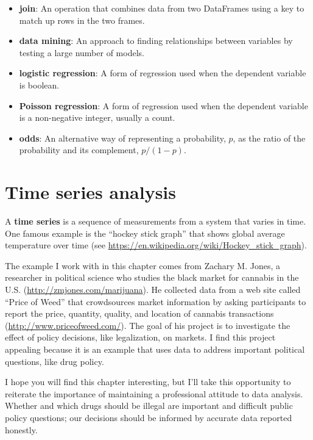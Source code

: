 \documentclass[12pt]{book}
\begin{document}
\begin{itemize}
\item {\bf join}: An operation that combines data from two DataFrames
using a key to match up rows in the two frames.

\item {\bf data mining}: An approach to finding relationships between
variables by testing a large number of models.

\item {\bf logistic regression}: A form of regression used when the
dependent variable is boolean.

\item {\bf Poisson regression}: A form of regression used when the
dependent variable is a non-negative integer, usually a count.

\item {\bf odds}: An alternative way of representing a probability, $p$, as
  the ratio of the probability and its complement, $p / (1-p)$.

\end{itemize}



\chapter{Time series analysis}

A {\bf time series} is a sequence of measurements from a system that
varies in time.  One famous example is the ``hockey stick graph'' that
shows global average temperature over time (see
\url{https://en.wikipedia.org/wiki/Hockey_stick_graph}).

The example I work with in this chapter comes from Zachary M. Jones, a
researcher in political science who studies the black market for
cannabis in the U.S.  (\url{http://zmjones.com/marijuana}).  He
collected data from a web site called ``Price of Weed'' that
crowdsources market information by asking participants to report the
price, quantity, quality, and location of cannabis transactions
(\url{http://www.priceofweed.com/}).  The goal of his project is to
investigate the effect of policy decisions, like legalization, on
markets.  I find this project appealing because it is an example that
uses data to address important political questions, like drug policy.

I hope you will
find this chapter interesting, but I'll take this opportunity to
reiterate the importance of maintaining a professional attitude to
data analysis.  Whether and which drugs should be illegal are
important and difficult public policy questions; our decisions should
be informed by accurate data reported honestly.
\end{document}
